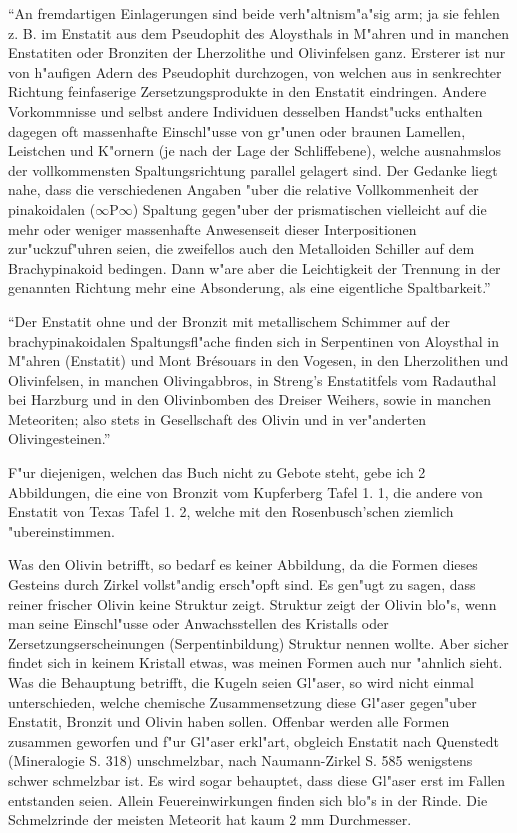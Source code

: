 \documentclass[a4paper, 11pt, oneside]{article}
\begin{document}
"`An fremdartigen Einlagerungen sind beide verh"altnism"a"sig arm; ja sie fehlen z. B. im Enstatit aus dem Pseudophit des Aloysthals in M"ahren und in manchen Enstatiten oder Bronziten der Lherzolithe und Olivinfelsen ganz. Ersterer ist nur von h"aufigen Adern des Pseudophit durchzogen, von welchen aus in senkrechter Richtung feinfaserige Zersetzungsprodukte in den Enstatit eindringen. Andere Vorkommnisse und selbst andere Individuen desselben Handst"ucks enthalten dagegen oft massenhafte Einschl"usse von gr"unen oder braunen Lamellen, Leistchen und K"ornern (je nach der Lage der Schliffebene), welche ausnahmslos der vollkommensten Spaltungsrichtung parallel gelagert sind. Der Gedanke liegt nahe, dass die verschiedenen Angaben "uber die relative Vollkommenheit der pinakoidalen ($\infty$P$\infty$) Spaltung gegen"uber der prismatischen vielleicht auf die mehr oder weniger massenhafte Anwesenseit dieser Interpositionen zur"uckzuf"uhren seien, die zweifellos auch den Metalloiden Schiller auf dem Brachypinakoid bedingen. Dann w"are aber die Leichtigkeit der Trennung in der genannten Richtung mehr eine Absonderung, als eine eigentliche Spaltbarkeit."'

"`Der Enstatit ohne und der Bronzit mit metallischem Schimmer auf der brachypinakoidalen Spaltungsfl"ache finden sich in Serpentinen von Aloysthal in M"ahren (Enstatit) und Mont Brésouars in den Vogesen, in den Lherzolithen und Olivinfelsen, in manchen Olivingabbros, in Streng's Enstatitfels vom Radauthal bei Harzburg und in den Olivinbomben des Dreiser Weihers, sowie in manchen Meteoriten; also stets in Gesellschaft des Olivin und in ver"anderten Olivingesteinen."'

F"ur diejenigen, welchen das Buch nicht zu Gebote steht, gebe ich 2 Abbildungen, die eine von Bronzit vom Kupferberg Tafel 1. 1, die andere von Enstatit von Texas Tafel 1. 2, welche mit den Rosenbusch'schen ziemlich "ubereinstimmen.

Was den Olivin betrifft, so bedarf es keiner Abbildung, da die Formen dieses Gesteins durch Zirkel vollst"andig ersch"opft sind. Es gen"ugt zu sagen, dass reiner frischer Olivin keine Struktur zeigt. Struktur zeigt der Olivin blo"s, wenn man seine Einschl"usse oder Anwachsstellen des Kristalls oder Zersetzungserscheinungen (Serpentinbildung) Struktur nennen wollte. Aber sicher findet sich in keinem Kristall etwas, was meinen Formen auch nur "ahnlich sieht. Was die Behauptung betrifft, die Kugeln seien Gl"aser, so wird nicht einmal unterschieden, welche chemische Zusammensetzung diese Gl"aser gegen"uber Enstatit, Bronzit und Olivin haben sollen. Offenbar werden alle Formen zusammen geworfen und f"ur Gl"aser erkl"art, obgleich Enstatit nach Quenstedt (Mineralogie S. 318) unschmelzbar, nach Naumann-Zirkel S. 585 wenigstens schwer schmelzbar ist. Es wird sogar behauptet, dass diese Gl"aser erst im Fallen entstanden seien. Allein Feuereinwirkungen finden sich blo"s in der Rinde. Die Schmelzrinde der meisten Meteorit hat kaum 2 mm Durchmesser.
\end{document}
